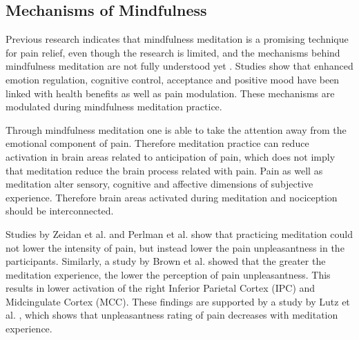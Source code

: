 

\subsection{Mechanisms of Mindfulness}
Previous research indicates that mindfulness meditation is a promising technique for pain relief, even though the research is limited, and the mechanisms behind mindfulness meditation are not fully understood yet \cite{Perlman2010}. 
Studies show that enhanced emotion regulation, cognitive control, acceptance and positive mood have been linked with health benefits as well as pain modulation. These mechanisms are modulated during mindfulness meditation practice. \cite{Zeidan2016, Zeidan2012, Tang2017, Perlman2010, Zeidan2011}

Through mindfulness meditation one is able to take the attention away from the emotional component of pain. Therefore meditation practice can reduce activation in brain areas related to anticipation of pain, which does not imply that meditation reduce the brain process related with pain. \cite{Brown2010}
Pain as well as meditation alter sensory, cognitive and affective dimensions of subjective experience. Therefore brain areas activated during meditation and nociception should be interconnected. \cite{Zeidan2011}

Studies by Zeidan et al. \cite{Zeidan2012} and Perlman et al. \cite{Perlman2010} show that practicing meditation could not lower the intensity of pain, but instead lower the pain unpleasantness in the participants. Similarly, a study by Brown et al. \cite{Brown2010} showed that the greater the meditation experience, the lower the perception of pain unpleasantness. This results in lower activation of the right Inferior Parietal Cortex (IPC) and Midcingulate Cortex (MCC). \cite{Brown2010} These findings are supported by a study by Lutz et al. \cite{Lutz2013}, which shows that unpleasantness rating of pain decreases with meditation experience.
 



